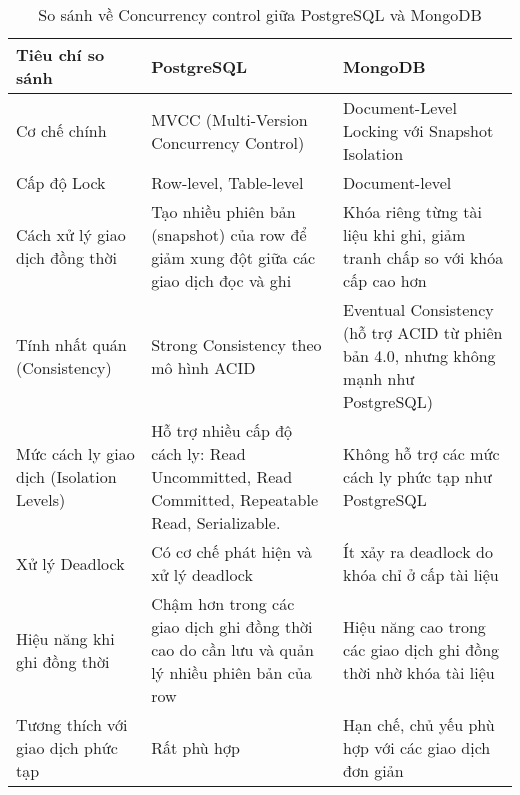 \begin{table}[H]
    \centering
    \begin{tabular}{|L{3.2cm}|L{5.05cm}|L{5.05cm}|} \hline 
         \textbf{Tiêu chí so sánh }&  \textbf{PostgreSQL}&  \textbf{MongoDB}\\ \hline 
         Cơ chế chính & MVCC (Multi-Version Concurrency Control) & Document-Level Locking với Snapshot Isolation\\ \hline 
         Cấp độ Lock & Row-level, Table-level & Document-level\\ \hline 
         Cách xử lý giao dịch đồng thời & Tạo nhiều phiên bản (snapshot) của row để giảm xung đột giữa các giao dịch đọc và ghi & Khóa riêng từng tài liệu khi ghi, giảm tranh chấp so với khóa cấp cao hơn\\ \hline 
         Tính nhất quán (Consistency) & Strong Consistency theo mô hình ACID & Eventual Consistency (hỗ trợ ACID từ phiên bản 4.0, nhưng không mạnh như PostgreSQL)\\ \hline 
         Mức cách ly giao dịch (Isolation Levels) & Hỗ trợ nhiều cấp độ cách ly: Read Uncommitted, Read Committed, Repeatable Read, Serializable. & Không hỗ trợ các mức cách ly phức tạp như PostgreSQL\\ \hline
         Xử lý Deadlock & Có cơ chế phát hiện và xử lý deadlock & Ít xảy ra deadlock do khóa chỉ ở cấp tài liệu\\ \hline
         Hiệu năng khi ghi đồng thời & Chậm hơn trong các giao dịch ghi đồng thời cao do cần lưu và quản lý nhiều phiên bản của row & Hiệu năng cao trong các giao dịch ghi đồng thời nhờ khóa tài liệu\\ \hline
         Tương thích với giao dịch phức tạp & Rất phù hợp & Hạn chế, chủ yếu phù hợp với các giao dịch đơn giản\\ \hline
    \end{tabular}
    \caption{So sánh về Concurrency control giữa PostgreSQL và MongoDB}
    \label{tab:concurrency_control}
\end{table}
\newpage